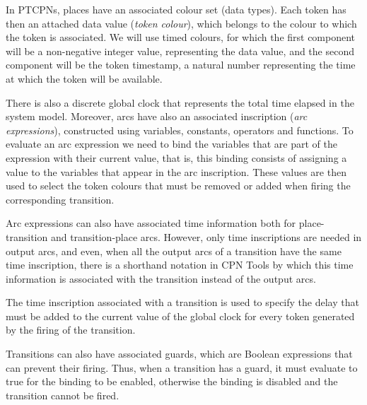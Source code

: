 In PTCPNs, places have an associated colour set (data types). 
Each token has then an attached data value
({\em token colour}),
which belongs to the colour to which the token is
associated. We will use timed colours, for which the first component
will be a non-negative integer value, representing the data value,
and the second component will be the token timestamp,
a natural number representing the time at which the 
token will be available.

There is also a discrete global clock that represents
the total time elapsed in the system model. Moreover, arcs have also 
an associated inscription ({\em arc expressions}),
constructed using variables, constants, operators
and functions. 
To evaluate an arc expression we need to
bind the variables that are part of the expression with their current value, that is, this binding
consists of assigning a value to the variables that appear in the
arc inscription. These values are then used to
select the token colours that must be removed or added when
firing the corresponding transition.

Arc expressions can also have associated time information
both for place-transition and transition-place arcs.
However, only time inscriptions are needed
in output arcs, and even, when all the output arcs
of a transition have the same time inscription,
there is a shorthand notation in CPN Tools
by which this time information is associated with
the transition instead of the output arcs.

The time inscription associated with a transition 
is used to specify the delay that must be added to the
current value of the global clock for
every token generated by the firing of the transition.

Transitions can also have associated guards, which
are Boolean expressions that can prevent their firing.
Thus, when a transition has a guard, it must evaluate to
true for the binding to be enabled,
otherwise the binding is disabled and 
the transition cannot be fired. 

